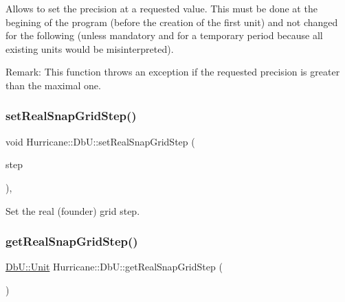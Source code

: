 Allows to set the precision at a requested value. This must be done at the begining of the program (before the creation of the first unit) and not changed for the following (unless mandatory and for a temporary period because all existing units would be misinterpreted).

\begin{DoxyParagraph}{Remark\+:}
This function throws an exception if the requested precision is greater than the maximal one. 
\end{DoxyParagraph}
\mbox{\label{group__DbUGroup_ga202cc3aa3364c2224647a29dde047fae}} 
\subsubsection{\texorpdfstring{set\+Real\+Snap\+Grid\+Step()}{setRealSnapGridStep()}}
{\footnotesize\ttfamily void Hurricane\+::\+Db\+U\+::set\+Real\+Snap\+Grid\+Step (\begin{DoxyParamCaption}\item[{\hyperlink{group__DbUGroup_ga4fbfa3e8c89347af76c9628ea06c4146}{Db\+U\+::\+Unit}}]{step }\end{DoxyParamCaption})\hspace{0.3cm}{\ttfamily [inline]}, {\ttfamily [static]}}

Set the real (founder) grid step. \mbox{\label{group__DbUGroup_ga09e46fcca6aaca94851adfa196e10170}} 
\subsubsection{\texorpdfstring{get\+Real\+Snap\+Grid\+Step()}{getRealSnapGridStep()}}
{\footnotesize\ttfamily \hyperlink{group__DbUGroup_ga4fbfa3e8c89347af76c9628ea06c4146}{Db\+U\+::\+Unit} Hurricane\+::\+Db\+U\+::get\+Real\+Snap\+Grid\+Step (\begin{DoxyParamCaption}{ }\end{DoxyParamCaption})\hspace{0.3cm}{\ttfamily [static]}}

